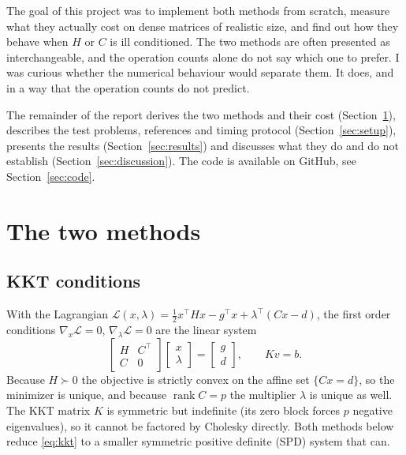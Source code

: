 \documentclass[10pt]{article}
\begin{document}
The goal of this project was to implement both methods from scratch, measure what they
actually cost on dense matrices of realistic size, and find out how they behave when $H$
or $C$ is ill conditioned. The two methods are often presented as interchangeable, and the
operation counts alone do not say which one to prefer. I was curious whether the
numerical behaviour would separate them. It does, and in a way that the operation counts
do not predict.

The remainder of the report derives the two methods and their cost (Section~\ref{sec:methods}),
describes the test problems, references and timing protocol (Section~\ref{sec:setup}),
presents the results (Section~\ref{sec:results}) and discusses what they do and do not
establish (Section~\ref{sec:discussion}). The code is available on GitHub, see
Section~\ref{sec:code}.

\section{The two methods}\label{sec:methods}

\subsection{KKT conditions}

With the Lagrangian $\mathcal L(x,\lambda)=\tfrac12 x^\top Hx - g^\top x+\lambda^\top(Cx-d)$,
the first order conditions $\nabla_x\mathcal L=0$, $\nabla_\lambda\mathcal L=0$ are the linear
system
\begin{equation}\label{eq:kkt}
\begin{bmatrix} H & C^\top\\ C & 0\end{bmatrix}
\begin{bmatrix} x\\ \lambda\end{bmatrix}
=\begin{bmatrix} g\\ d\end{bmatrix},
\qquad K v = b .
\end{equation}
Because $H\succ0$ the objective is strictly convex on the affine set $\{Cx=d\}$, so the
minimizer is unique, and because $\operatorname{rank}C=p$ the multiplier $\lambda$ is
unique as well. The KKT matrix $K$ is symmetric but indefinite (its zero block forces $p$ negative
eigenvalues), so it cannot be factored by Cholesky directly. Both methods below reduce
\eqref{eq:kkt} to a smaller symmetric positive definite (SPD) system that can.
\end{document}
